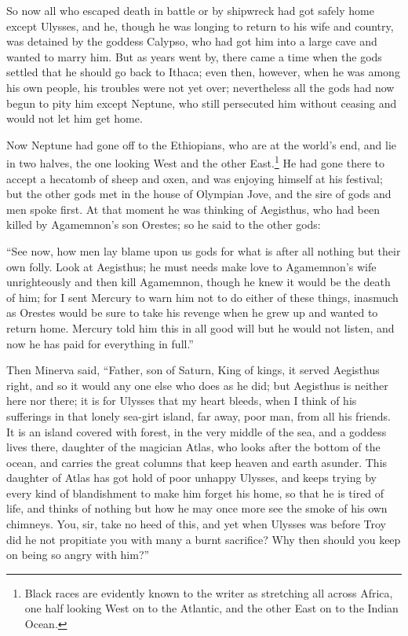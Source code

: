 So now all who escaped death in battle or by shipwreck had got safely home
except Ulysses, and he, though he was longing to return to his wife and
country, was detained by the goddess Calypso, who had got him into a large cave
and wanted to marry him. But as years went by, there came a time when the gods
settled that he should go back to Ithaca; even then, however, when he was among
his own people, his troubles were not yet over; nevertheless all the gods had
now begun to pity him except Neptune, who still persecuted him without ceasing
and would not let him get home.

Now Neptune had gone off to the Ethiopians, who are at the world’s end, and lie
in two halves, the one looking West and the other East.\footnote{Black races are evidently known to the writer as stretching all across
Africa, one half looking West on to the Atlantic, and the other East on to the
Indian Ocean.} He had gone there to accept a hecatomb
of sheep and oxen, and was enjoying himself at his festival; but the other gods
met in the house of Olympian Jove, and the sire of gods and men spoke first. At
that moment he was thinking of Aegisthus, who had been killed by Agamemnon’s
son Orestes; so he said to the other gods:

“See now, how men lay blame upon us gods for what is after all nothing but
their own folly. Look at Aegisthus; he must needs make love to Agamemnon’s wife
unrighteously and then kill Agamemnon, though he knew it would be the death of
him; for I sent Mercury to warn him not to do either of these things, inasmuch
as Orestes would be sure to take his revenge when he grew up and wanted to
return home. Mercury told him this in all good will but he would not listen,
and now he has paid for everything in full.”

Then Minerva said, “Father, son of Saturn, King of kings, it served Aegisthus
right, and so it would any one else who does as he did; but Aegisthus is
neither here nor there; it is for Ulysses that my heart bleeds, when I think of
his sufferings in that lonely sea-girt island, far away, poor man, from all his
friends. It is an island covered with forest, in the very middle of the sea,
and a goddess lives there, daughter of the magician Atlas, who looks after the
bottom of the ocean, and carries the great columns that keep heaven and earth
asunder. This daughter of Atlas has got hold of poor unhappy Ulysses, and keeps
trying by every kind of blandishment to make him forget his home, so that he is
tired of life, and thinks of nothing but how he may once more see the smoke of
his own chimneys. You, sir, take no heed of this, and yet when Ulysses was
before Troy did he not propitiate you with many a burnt sacrifice? Why then
should you keep on being so angry with him?”

